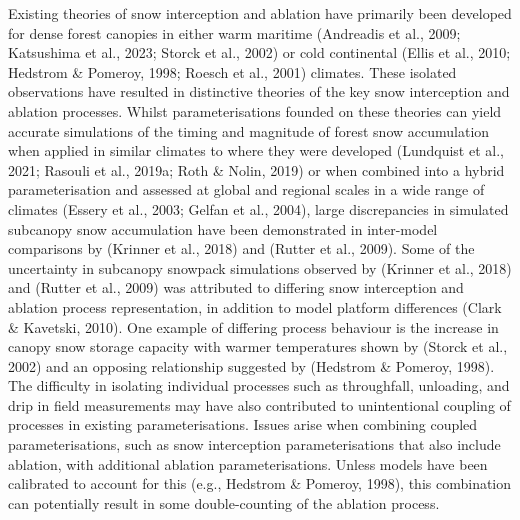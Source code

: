 \documentclass[
  letterpaper,
]{tex/uofsthesis-cs}
\begin{document}
Existing theories of snow interception and ablation have primarily been
developed for dense forest canopies in either warm maritime (Andreadis
et al., 2009; Katsushima et al., 2023; Storck et al., 2002) or cold
continental (Ellis et al., 2010; Hedstrom \& Pomeroy, 1998; Roesch et
al., 2001) climates. These isolated observations have resulted in
distinctive theories of the key snow interception and ablation
processes. Whilst parameterisations founded on these theories can yield
accurate simulations of the timing and magnitude of forest snow
accumulation when applied in similar climates to where they were
developed (Lundquist et al., 2021; Rasouli et al., 2019a; Roth \& Nolin,
2019) or when combined into a hybrid parameterisation and assessed at
global and regional scales in a wide range of climates (Essery et al.,
2003; Gelfan et al., 2004), large discrepancies in simulated subcanopy
snow accumulation have been demonstrated in inter-model comparisons by
(Krinner et al., 2018) and (Rutter et al., 2009). Some of the
uncertainty in subcanopy snowpack simulations observed by (Krinner et
al., 2018) and (Rutter et al., 2009) was attributed to differing snow
interception and ablation process representation, in addition to model
platform differences (Clark \& Kavetski, 2010). One example of differing
process behaviour is the increase in canopy snow storage capacity with
warmer temperatures shown by (Storck et al., 2002) and an opposing
relationship suggested by (Hedstrom \& Pomeroy, 1998). The difficulty in
isolating individual processes such as throughfall, unloading, and drip
in field measurements may have also contributed to unintentional
coupling of processes in existing parameterisations. Issues arise when
combining coupled parameterisations, such as snow interception
parameterisations that also include ablation, with additional ablation
parameterisations. Unless models have been calibrated to account for
this (e.g., Hedstrom \& Pomeroy, 1998), this combination can potentially
result in some double-counting of the ablation process.
\end{document}
